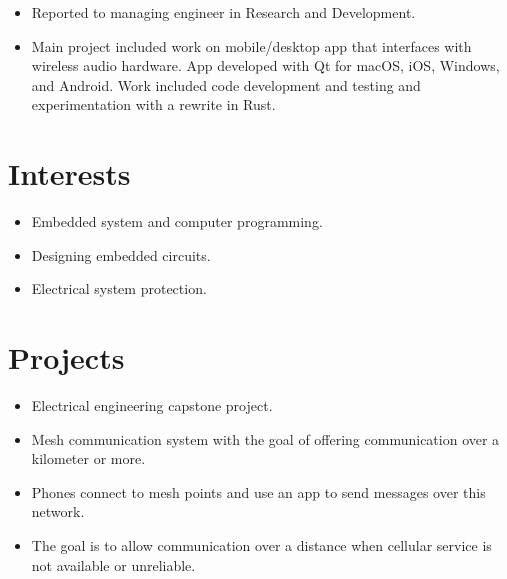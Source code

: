 \documentclass{lsanche_cv}
\begin{document}
\begin{multicols*}{2}
	\divider

    \begin{itemize}
      \item Reported to managing engineer in Research and Development.
	  \item Main project included work on mobile/desktop app that interfaces with wireless audio hardware. App developed with Qt for macOS, iOS, Windows, and Android. Work included code development and testing and experimentation with a rewrite in Rust.
    \end{itemize}

    \columnbreak
    
  \section{Interests}
    \begin{itemize}
      \item Embedded system and computer programming.
      \item Designing embedded circuits.
			\item Electrical system protection.
    \end{itemize}

    \section{Projects}

      \begin{itemize}
        \item Electrical engineering capstone project.
        \item Mesh communication system with the goal of offering communication over a kilometer or more. 
        \item Phones connect to mesh points and use an app to send messages over this network.
        \item The goal is to allow communication over a distance when cellular service is not available or unreliable.
      \end{itemize}

    \divider


\end{multicols*}
\end{document}
